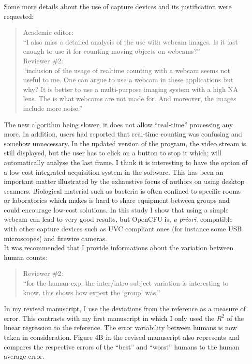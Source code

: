 \documentclass{letter}
\begin{document}
\begin{letter}{}
	Some more details about the use of capture devices and its justification were requested:
	 \begin{quote}
	 Academic editor:\\
	``I also miss a detailed analysis of the use with webcam images. Is it fast enough to use it for counting moving objects on webcams?''\\
	 Reviewer \#2:\\
	``inclusion of the usage of realtime counting with a webcam seems not useful to me.
	 One can argue to use a webcam in these applications but why?
	It is better to use a multi-purpose imaging system with a high NA lens. 
	The is what webcams are not made for. 
	And moreover, the images include more noise.''\\	
 \end{quote}
 The new algorithm being slower, it does not allow ``real-time'' processing any more. 
In addition, users had reported that real-time counting was confusing and somehow unnecessary.
 In the updated version of the program, the video stream is still displayed, but the user has to click on a button to stop it which; will automatically analyse the last frame.
 I think it is interesting to have the option of a low-cost integrated acquisition system in the software.
This has been an important matter illustrated by the exhaustive focus of authors on using desktop scanners.
 Biological material such as bacteria is often confined to specific rooms or laboratories which makes is hard to share equipment between groups and could encourage low-cost solutions.
 In this study I show that using a simple webcam can lead to very good results, but OpenCFU is, \emph{a priori}, compatible with other capture devices such
 as UVC compliant ones (for instance some USB microscopes) and firewire cameras. \\

It was recommended that I provide informations about the variation between human counts:
	 \begin{quote}
	 Reviewer \#2:\\
	 ``for the human exp. the inter/intro subject variation is interesting to know. this shows how expert the `group' was.''
	 \end{quote}
In my revised manuscript, I use the deviations from the reference as a measure of error.
This contrasts with my first manuscript in which I only used the $R^2$ of the linear regression to the reference. 
The error variability between humans is now taken in consideration.  
Figure 4B in the revised manuscript also represents and compares the respective errors of the ``best'' and ``worst'' 
humans to the human average error.\\


\end{letter}
\end{document}
